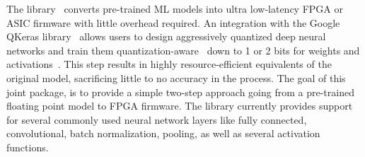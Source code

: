 The \hlsfml library~\cite{Duarte:2018ite,aarrestad2021fast,DiGuglielmo:2020eqx,Coelho:2020zfu} converts pre-trained ML models into ultra low-latency FPGA or ASIC firmware with little overhead required. 
An integration with the Google QKeras library~\cite{qkeras} allows users to design aggressively quantized deep neural networks and train them quantization-aware~\cite{Coelho:2020zfu} down to 1 or 2 bits for weights and activations~\cite{DiGuglielmo:2020eqx}. 
This step results in highly resource-efficient equivalents of the original model, sacrificing little to no accuracy in the process. The goal of this joint package, is to provide a simple two-step approach going from a pre-trained floating point model to FPGA firmware.
The \hlsfml library currently provides support for several commonly used neural network layers like fully connected, convolutional, batch normalization, pooling, as well as several activation functions.
